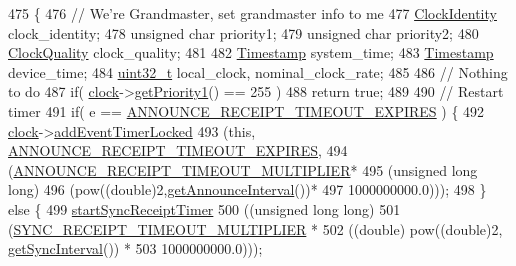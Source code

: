 \begin{DoxyCode}
475 \{
476     \textcolor{comment}{// We're Grandmaster, set grandmaster info to me}
477     \hyperlink{class_clock_identity}{ClockIdentity} clock\_identity;
478     \textcolor{keywordtype}{unsigned} \textcolor{keywordtype}{char} priority1;
479     \textcolor{keywordtype}{unsigned} \textcolor{keywordtype}{char} priority2;
480     \hyperlink{struct_clock_quality}{ClockQuality} clock\_quality;
481 
482     \hyperlink{class_timestamp}{Timestamp} system\_time;
483     \hyperlink{class_timestamp}{Timestamp} device\_time;
484     \hyperlink{parse_8c_a6eb1e68cc391dd753bc8ce896dbb8315}{uint32\_t} local\_clock, nominal\_clock\_rate;
485 
486     \textcolor{comment}{// Nothing to do}
487     \textcolor{keywordflow}{if}( \hyperlink{class_common_port_aa2bc8731fa5aeb5b033feebc2b67258c}{clock}->\hyperlink{class_i_e_e_e1588_clock_a3577d05b0d34d976c23354585d7516ad}{getPriority1}() == 255 )
488         \textcolor{keywordflow}{return} \textcolor{keyword}{true};
489 
490     \textcolor{comment}{// Restart timer}
491     \textcolor{keywordflow}{if}( e == \hyperlink{ieee1588_8hpp_a5667b805d857c6d28f83f6038a0272d3a7060ecc9be507f5c8828eedf6a163c8b}{ANNOUNCE\_RECEIPT\_TIMEOUT\_EXPIRES} ) \{
492         \hyperlink{class_common_port_aa2bc8731fa5aeb5b033feebc2b67258c}{clock}->\hyperlink{class_i_e_e_e1588_clock_a4747f09108bd78ecd68d58dad4358d77}{addEventTimerLocked}
493             (\textcolor{keyword}{this}, \hyperlink{ieee1588_8hpp_a5667b805d857c6d28f83f6038a0272d3a7060ecc9be507f5c8828eedf6a163c8b}{ANNOUNCE\_RECEIPT\_TIMEOUT\_EXPIRES},
494              (\hyperlink{common__port_8hpp_aeda88e4edf1cca8ee8e367150c8004b5}{ANNOUNCE\_RECEIPT\_TIMEOUT\_MULTIPLIER}*
495               (\textcolor{keywordtype}{unsigned} \textcolor{keywordtype}{long} \textcolor{keywordtype}{long})
496               (pow((\textcolor{keywordtype}{double})2,\hyperlink{class_common_port_a7aa1a5fddf7129f600c97c018087b7b8}{getAnnounceInterval}())*
497                1000000000.0)));
498     \} \textcolor{keywordflow}{else} \{
499         \hyperlink{class_common_port_a25bf37b5026e4b86b138498915330656}{startSyncReceiptTimer}
500             ((\textcolor{keywordtype}{unsigned} \textcolor{keywordtype}{long} \textcolor{keywordtype}{long})
501              (\hyperlink{common__port_8hpp_ab8e9bce6c4f31a2db1b778fdfd63fae3}{SYNC\_RECEIPT\_TIMEOUT\_MULTIPLIER} *
502               ((\textcolor{keywordtype}{double}) pow((\textcolor{keywordtype}{double})2, \hyperlink{class_common_port_a963da67f8dd0b8c72bd19ca91c3ce00d}{getSyncInterval}()) *
503                1000000000.0)));

\end{DoxyCode}
